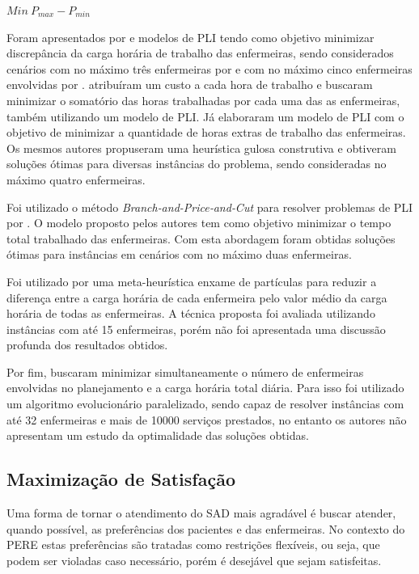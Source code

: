 \begin{center}
$Min~P_{max} - P_{min}$
\end{center}


Foram apresentados por  e   modelos de \ac{PLI} tendo como objetivo minimizar discrepância da carga horária de trabalho das enfermeiras, sendo considerados cenários com no máximo três enfermeiras por  e com no máximo cinco enfermeiras envolvidas por . 
  atribuíram um custo a cada hora de trabalho e buscaram minimizar o somatório das horas trabalhadas por cada uma das as enfermeiras, também utilizando um modelo de \ac{PLI}. 
Já  elaboraram um modelo de \ac{PLI} com o objetivo de minimizar a quantidade de horas extras de trabalho das enfermeiras. Os mesmos autores propuseram uma heurística gulosa construtiva e obtiveram soluções ótimas para diversas instâncias do problema, sendo consideradas no máximo quatro enfermeiras. 

Foi utilizado o método \textit{Branch‐and-Price‐and‐Cut} para resolver problemas de \acl{PLI} por . O modelo proposto pelos autores tem como objetivo minimizar o tempo total trabalhado das enfermeiras. Com esta abordagem foram obtidas soluções ótimas para instâncias em cenários com no máximo duas enfermeiras.  

Foi utilizado por  uma meta-heurística enxame de partículas para reduzir a diferença entre a carga horária de cada enfermeira pelo valor médio da carga horária de todas as enfermeiras. A técnica proposta foi avaliada utilizando instâncias com até 15 enfermeiras, porém não foi apresentada uma discussão profunda dos resultados obtidos. 

Por fim,  buscaram minimizar simultaneamente o número de enfermeiras envolvidas no planejamento e a carga horária total diária. Para isso foi utilizado um algoritmo evolucionário paralelizado, sendo capaz de resolver instâncias com até 32 enfermeiras e mais de 10000 serviços prestados, no entanto os autores não apresentam um estudo da optimalidade das soluções obtidas.

\subsection{Maximização de Satisfação}

Uma forma de tornar o atendimento do \ac{SAD} mais agradável é buscar atender, quando possível, as preferências dos pacientes e das enfermeiras. No contexto do \ac{PERE} estas preferências são tratadas como restrições flexíveis, ou seja, que podem ser violadas caso necessário, porém é desejável que sejam satisfeitas.

